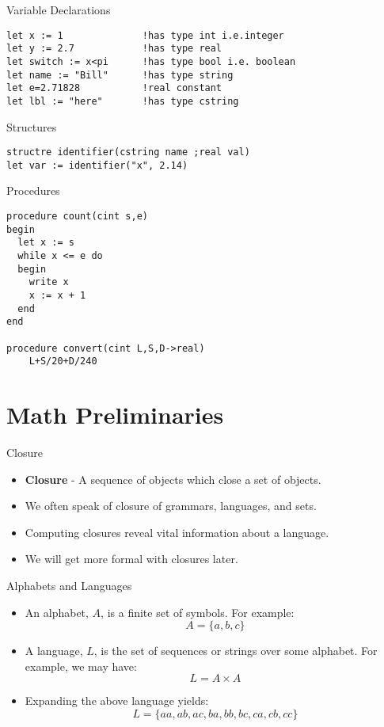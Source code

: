 \documentclass{beamer}
\begin{document}
\begin{frame}[fragile]{Variable Declarations}

    \begin{verbatim}
let x := 1              !has type int i.e.integer
let y := 2.7            !has type real
let switch := x<pi      !has type bool i.e. boolean
let name := "Bill"      !has type string
let e=2.71828           !real constant
let lbl := "here"       !has type cstring
    \end{verbatim}
\end{frame}

\begin{frame}[fragile]{Structures}
\begin{verbatim}
structre identifier(cstring name ;real val)
let var := identifier("x", 2.14)
\end{verbatim}
\end{frame}

\begin{frame}[fragile]{Procedures}
\begin{verbatim}
procedure count(cint s,e)
begin
  let x := s
  while x <= e do
  begin
    write x
    x := x + 1
  end
end

procedure convert(cint L,S,D->real)
    L+S/20+D/240  
\end{verbatim}
\end{frame}


\section{Math Preliminaries}
\begin{frame}{Closure}
\begin{itemize}[<+->]
    \item {\bf Closure} - A sequence of objects which close a set of
    objects.
    \item We often speak of closure of grammars, languages, and sets.
    \item Computing closures reveal vital information about
    a language.
    \item  We will get more formal with closures later.
\end{itemize}
\end{frame}

\begin{frame}{Alphabets and Languages}
\begin{itemize}[<+->]
    \item An alphabet, $A$, is a finite set of symbols.
    For example:
    \[
        A=\{a, b, c\}
    \]
    \item A language, $L$, is the set of sequences or strings over
    some alphabet. For example, we may have:
    \[
        L=A \times A
    \]
    \item Expanding the above language yields:
    \[
        L=\{aa, ab, ac, ba, bb, bc, ca, cb, cc\}
    \]
\end{itemize}
\end{frame}
\end{document}
